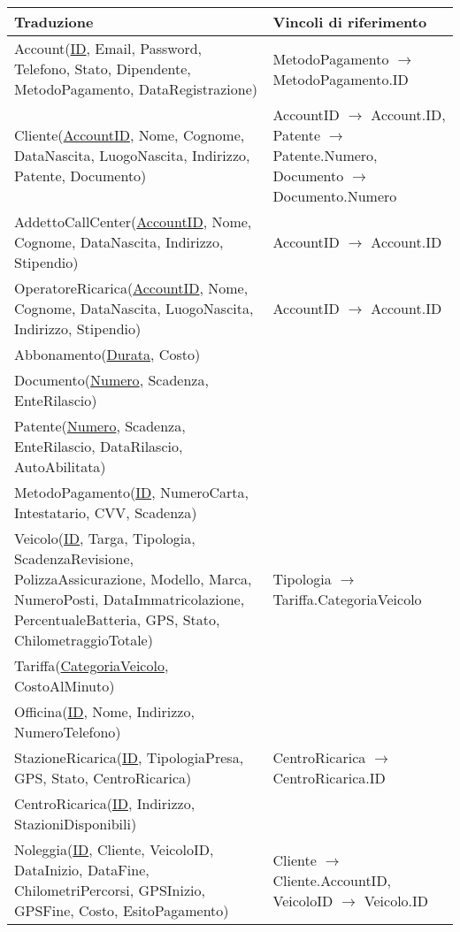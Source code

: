 \documentclass{article}
\begin{document}
\begin{table}[H]
    \centering
    \begin{tabularx}{\textwidth}{|X|X|}
        \hline
        \textbf{Traduzione} & \textbf{Vincoli di riferimento} \\ \hline
        Account(\underline{ID}, Email, Password, Telefono, Stato, Dipendente, MetodoPagamento, DataRegistrazione) & MetodoPagamento \(\to\) MetodoPagamento.ID \\ \hline
        Cliente(\underline{AccountID}, Nome, Cognome, DataNascita, LuogoNascita, Indirizzo, Patente, Documento) & AccountID \(\to\) Account.ID, Patente \(\to\) Patente.Numero, Documento \(\to\) Documento.Numero \\ \hline
        AddettoCallCenter(\underline{AccountID}, Nome, Cognome, DataNascita, Indirizzo, Stipendio) & AccountID \(\to\) Account.ID \\ \hline
        OperatoreRicarica(\underline{AccountID}, Nome, Cognome, DataNascita, LuogoNascita, Indirizzo, Stipendio) & AccountID \(\to\) Account.ID \\ \hline
        Abbonamento(\underline{Durata}, Costo) & \\ \hline
        Documento(\underline{Numero}, Scadenza, EnteRilascio) & \\ \hline
        Patente(\underline{Numero}, Scadenza, EnteRilascio, DataRilascio, AutoAbilitata) & \\ \hline
        MetodoPagamento(\underline{ID}, NumeroCarta, Intestatario, CVV, Scadenza) & \\ \hline
        Veicolo(\underline{ID}, Targa, Tipologia, ScadenzaRevisione, PolizzaAssicurazione, Modello, Marca, NumeroPosti, DataImmatricolazione, PercentualeBatteria, GPS, Stato, ChilometraggioTotale) & Tipologia \(\to\) Tariffa.CategoriaVeicolo \\ \hline
        Tariffa(\underline{CategoriaVeicolo}, CostoAlMinuto) & \\ \hline
        Officina(\underline{ID}, Nome, Indirizzo, NumeroTelefono) & \\ \hline
        StazioneRicarica(\underline{ID}, TipologiaPresa, GPS, Stato, CentroRicarica) & CentroRicarica \(\to\) CentroRicarica.ID \\ \hline
        CentroRicarica(\underline{ID}, Indirizzo, StazioniDisponibili) & \\ \hline
        Noleggia(\underline{ID}, Cliente, VeicoloID, DataInizio, DataFine, ChilometriPercorsi, GPSInizio, GPSFine, Costo, EsitoPagamento) & Cliente \(\to\) Cliente.AccountID, VeicoloID \(\to\) Veicolo.ID \\ \hline

\end{tabularx}
\end{table}
\end{document}
